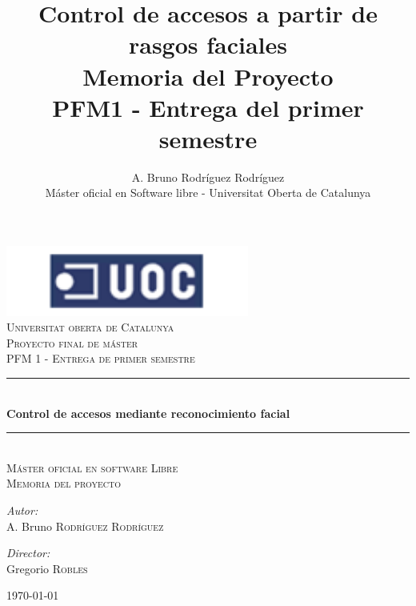 \documentclass[a4paper]{book}
\newcommand{\HRule}{\rule{\linewidth}{0.5mm}}
\begin{document}
\frontmatter
\title {Control de accesos a partir de rasgos faciales \\ \Large{Memoria del Proyecto} \\ PFM1 - Entrega del primer semestre}
\author {A. Bruno Rodríguez Rodríguez \\ \normalsize{Máster oficial en Software libre - Universitat Oberta de Catalunya}}
\date{}

\begin{titlepage}
\begin{center}
	\includegraphics[width=8cm]{uoc.png}\\[1.5cm]
 
	\textsc{\LARGE Universitat oberta de Catalunya}\\[2cm]

	\textsc{\Huge Proyecto final de máster}\\[1cm]
	\textsc{\large PFM 1 - Entrega de primer semestre}\\[1cm]

	\HRule \\[1cm]
	{ \LARGE \bfseries Control de accesos mediante reconocimiento facial}\\[1cm]
	\HRule \\[2cm]

	\textsc{\Large Máster oficial en software Libre}\\[1cm]

	\textsc{\Large Memoria del proyecto}\\[4cm]
 
	\begin{minipage}{0.4\textwidth}
	\begin{flushleft} \large
	\emph{Autor:}\\
	\small{A. Bruno \textsc{Rodríguez Rodríguez}}
	\end{flushleft}
	\end{minipage}
	\begin{minipage}{0.4\textwidth}
	\begin{flushright} \large
	\emph{Director:} \\
	Gregorio \textsc{Robles}
	\end{flushright}
	\end{minipage}

	\vfill
 
	{\large \today}
 
\end{center}
\end{titlepage}
\end{document}
